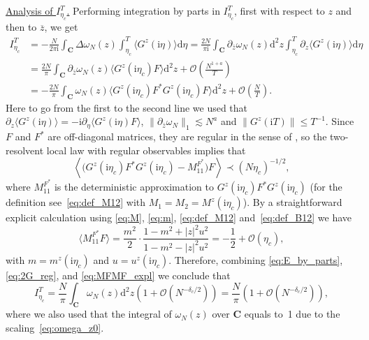 \documentclass[10pt]{amsart}
\numberwithin{equation}{section}
\newcommand{\dif}{\mathrm{d}}
\newcommand{\C}{\mathbf{C}}
\newcommand{\ii}{\mathrm{i}}
\begin{document}
\noindent\underline{Analysis of $I_{\eta_c}^T$.} Performing integration by parts in $I_{\eta_c}^T$, first with respect to $z$ and then to $\overline{z}$, we get 
\begin{equation}
\begin{split}
I_{\eta_c}^T &= -\frac{N}{2\pi \ii}\int_\C \Delta \omega_N(z) \int_{\eta_c}^T \langle G^z(\ii\eta)\rangle\dif\eta = \frac{2N}{\pi\ii} \int_\C\partial_{\bar{z}} \omega_N(z)\dif^2 z\int_{\eta_c}^T \partial_z \langle G^z(\ii\eta)\rangle\dif\eta\\
& = \frac{2N}{\pi}\int_\C \partial_{\bar{z}} \omega_N(z) \langle G^z(\ii\eta_c)F\rangle\dif^2 z + \mathcal{O}\left(\frac{N^{1+a}}{T}\right)\\
&=-\frac{2N}{\pi}\int_\C \omega_N(z) \langle G^z(\ii\eta_c)F^*G^z(\ii\eta_c)F\rangle \dif^2 z +\mathcal{O}\left(\frac{N}{T}\right).
\end{split}
\label{eq:E_by_parts}
\end{equation}
Here to go from the first to the second line we used that $\partial_z \langle G^z(\ii\eta)\rangle = -\ii\partial_\eta \langle G^z(\ii\eta)F\rangle$, $\lVert \partial_{\bar{z}} \omega_N\rVert_{1}\lesssim N^a$ and $\| G^z(\ii T)\|\le T^{-1}$. Since $F$ and $F^*$ are off-diagonal matrices, they are regular in the sense of \cite[Definition 3.1]{non-herm_overlaps}, so the two-resolvent local law with regular observables \cite[Theorem~4.4]{non-herm_overlaps} implies that
\begin{equation}
\left\langle \big(G^z(\ii\eta_c)F^*G^z(\ii\eta_c)- M_{11}^{F^*}\big)F\right\rangle\prec (N\eta_c)^{-1/2},
\label{eq:2G_reg}
\end{equation}
where $M_{11}^{F^*}$ is the deterministic approximation to $G^z(\ii\eta_c)F^*G^z(\ii\eta_c)$ (for the definition see~\eqref{eq:def_M12} with $M_1=M_2=M^z(\ii\eta_c)$). By a straightforward explicit calculation using \eqref{eq:M}, \eqref{eq:m}, \eqref{eq:def_M12} and~\eqref{eq:def_B12} we have
\begin{equation}
\langle M_{11}^{F^*}F\rangle = \frac{m^2}{2}\cdot \frac{1-m^2+|z|^2u^2}{1-m^2-|z|^2u^2} =-\frac{1}{2}+\mathcal{O}(\eta_c),
\label{eq:MFMF_expl}
\end{equation}
with $m=m^z(\ii\eta_c)$ and $u=u^z(\ii\eta_c)$. Therefore, combining \eqref{eq:E_by_parts}, \eqref{eq:2G_reg}, and \eqref{eq:MFMF_expl} we conclude that
\begin{equation}
I_{\eta_c}^T = \frac{N}{\pi}\int_\C \omega_N(z)\dif^2 z \left(1+\mathcal{O}(N^{-\delta_c/2})\right)=\frac{N}{\pi} \left(1+\mathcal{O}(N^{-\delta_c/2})\right),
\label{eq:E_large_eta}
\end{equation}
where we also used that the integral of $\omega_N(z)$ over $\C$ equals to~1 due to the scaling~\eqref{eq:omega_z0}.
\end{document}
